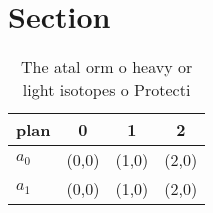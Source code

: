 \documentclass[a4paper]{article}
\begin{document}
\section{Section}

\begin{table}
\begin{adjustbox}{width=0.6\columnwidth}
\begin{tabular}{|l|l|l|l|}
\hline
\textbf{plan} & \multicolumn{1}{c|}{\textbf{0}} & \multicolumn{1}{c|}{\textbf{1}} & \multicolumn{1}{c|}{\textbf{2}} \\ \hline
\textbf{$a_0$}  & (0,0) & (1,0) & (2,0) \\ \hline
\textbf{$a_1$}  & (0,0) & (1,0) & (2,0) \\ \hline
\end{tabular}
\end{adjustbox}
\caption{The atal orm o heavy or light isotopes o Protecti
}
\end{table}
\end{document}
